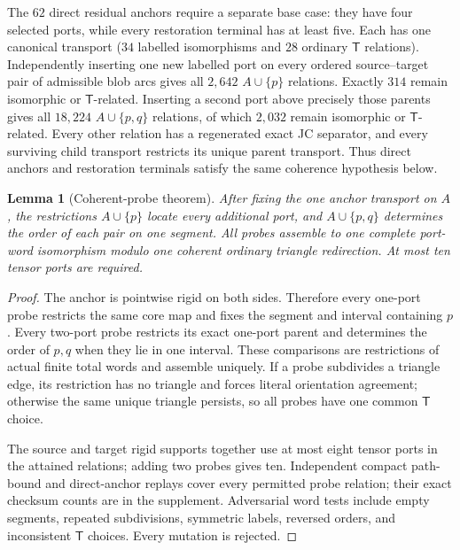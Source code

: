 \documentclass[11pt]{article}
\newtheorem{lemma}[theorem]{Lemma}
\theoremstyle{remark}
\newcommand{\Tmove}{\mathsf T}
\begin{document}
The $62$ direct residual anchors require a separate base case: they have four
selected ports, while every restoration terminal has at least five.  Each has
one canonical transport ($34$ labelled isomorphisms and $28$ ordinary
$\Tmove$ relations).  Independently inserting one new labelled port on every
ordered source--target pair of admissible blob arcs gives all $2{,}642$
$A\cup\{p\}$ relations.  Exactly $314$ remain isomorphic or
$\Tmove$-related.  Inserting a second port above precisely those parents gives
all $18{,}224$ $A\cup\{p,q\}$ relations, of which $2{,}032$ remain
isomorphic or $\Tmove$-related.  Every other relation has a regenerated exact
JC separator, and every surviving child transport restricts its unique parent
transport.  Thus direct anchors and restoration terminals satisfy the same
coherence hypothesis below.

\begin{lemma}[Coherent-probe theorem]\label{lem:probes}
After fixing the one anchor transport on $A$, the restrictions $A\cup\{p\}$
locate every additional port, and $A\cup\{p,q\}$ determines the order of
each pair on one segment.  All probes assemble to one complete port-word
isomorphism modulo one coherent ordinary triangle redirection.  At most ten
tensor ports are required.
\end{lemma}

\begin{proof}
The anchor is pointwise rigid on both sides.  Therefore every one-port probe
restricts the same core map and fixes the segment and interval containing
$p$.  Every two-port probe restricts its exact one-port parent and determines
the order of $p,q$ when they lie in one interval.  These comparisons are
restrictions of actual finite total words and assemble uniquely.  If a probe
subdivides a triangle edge, its restriction has no triangle and forces
literal orientation agreement; otherwise the same unique triangle persists,
so all probes have one common $\Tmove$ choice.

The source and target rigid supports together use at most eight tensor ports
in the attained relations; adding two probes gives ten.  Independent compact
path-bound and direct-anchor replays cover every permitted probe relation;
their exact checksum counts are in the supplement.  Adversarial word tests
include empty segments, repeated subdivisions, symmetric labels, reversed
orders, and inconsistent $\Tmove$ choices.  Every mutation is rejected.
\end{proof}
\end{document}
